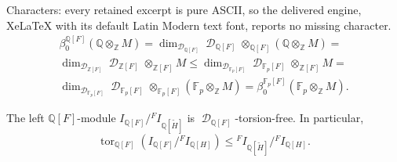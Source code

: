 \documentclass[10pt,a4paper]{amsart}
\DeclareMathOperator{\D}{\mathcal D}
\DeclareMathOperator{\tor}{tor}
\newcommand{\F}{\mathbb{F}}
\newcommand{\Q}{\mathbb{Q}}
\newcommand{\Z}{\mathbb{Z}}
\begin{document}
Characters: every retained excerpt is pure ASCII, so the delivered engine, XeLaTeX with its default Latin Modern text font, reports no missing character.
\begin{multline}\label{Qp}
\beta_0^{\Q[F]}(\Q\otimes_{\Z} M)=\dim_{\D_{\Q[F]}}\D_{\Q[F]}\otimes_{\Q[F]} (\Q\otimes_{\Z} M)=\\ \dim_{\D_{\Z[F]}}\D_{\Z[F]}\otimes_{\Z[F]} M\le 
\dim_{\D_{\F_p[F]}}\D_{\F_p[F]}\otimes_{\Z[F]} M=\\ \dim_{\D_{\F_p[F]}}\D_{\F_p[F]}\otimes_{\F_p[F]} (\F_p\otimes_{\Z} M)= \beta_0^{\F_p[F]}(\F_p\otimes_{\Z} M).
\end{multline}

\begin{claim} 
The left $\Q[F]$-module $I_{\Q[F]}/{}^FI_{\Q[\widetilde H]}$ is $\D_{\Q[F]}$-torsion-free. In particular, $$ \tor_{\Q[F]}(I_{\Q[F]}/{}^FI_{\Q[H]})\leq {}^FI_{\Q[\widetilde H]}/{}^FI_{\Q[H]}.$$
\end{claim}
\end{document}
